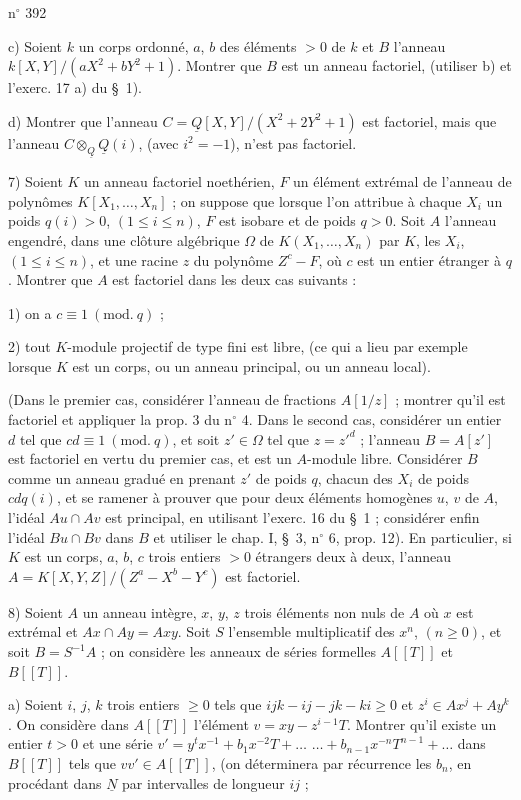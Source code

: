 \hfill n$^{\circ}$ 392

c) Soient $k$ un corps ordonné, $a$, $b$ des éléments $>0$ de $k$ et $B$ l'anneau $k[X,Y]/(aX^2+bY^2+1)$. Montrer que $B$ est un anneau factoriel, (utiliser b) et l'exerc. 17 a) du \S~1).

d) Montrer que l'anneau $C=\underline{Q}[X,Y]/(X^2+2Y^2+1)$ est factoriel, mais que l'anneau $C\otimes_{\underline{Q}}\underline{Q}(i)$, (avec $i^2=-1$), n'est pas factoriel.

7) Soient $K$ un anneau factoriel noethérien, $F$ un élément extrémal de l'anneau de polynômes $K[X_1,\ldots,X_n]$ ; on suppose que lorsque l'on attribue à chaque $X_i$ un poids $q(i)>0$, $(1\leq i\leq n)$, $F$ est isobare et de poids $q>0$. Soit $A$ l'anneau engendré, dans une clôture algébrique $\Omega$ de $K(X_1,\ldots,X_n)$ par $K$, les $X_i$, $(1\leq i\leq n)$, et une racine $z$ du polynôme $Z^c-F$, où $c$ est un entier étranger à $q$. Montrer que $A$ est factoriel dans les deux cas suivants :

1) on a $c\equiv 1\ (\mathrm{mod.}\ q)$ ;

2) tout $K$-module projectif de type fini est libre, (ce qui a lieu par exemple lorsque $K$ est un corps, ou un anneau principal, ou un anneau local).

(Dans le premier cas, considérer l'anneau de fractions $A[1/z]$ ; montrer qu'il est factoriel et appliquer la prop. 3 du n$^{\circ}$ 4. Dans le second cas, considérer un entier $d$ tel que $cd\equiv 1\ (\mathrm{mod.}\ q)$, et soit $z'\in\Omega$ tel que $z=z'^{d}$ ; l'anneau $B=A[z']$ est factoriel en vertu du premier cas, et est un $A$-module libre. Considérer $B$ comme un anneau gradué en prenant $z'$ de poids $q$, chacun des $X_i$ de poids $cdq(i)$, et se ramener à prouver que pour deux éléments homogènes $u$, $v$ de $A$, l'idéal $Au\cap Av$ est principal, en utilisant l'exerc. 16 du \S~1 ; considérer enfin l'idéal $Bu\cap Bv$ dans $B$ et utiliser le chap. I, \S~3, n$^{\circ}$ 6, prop. 12). En particulier, si $K$ est un corps, $a$, $b$, $c$ trois entiers $>0$ étrangers deux à deux, l'anneau $A=K[X,Y,Z]/(Z^a-X^b-Y^c)$ est factoriel.

8) Soient $A$ un anneau intègre, $x$, $y$, $z$ trois éléments non nuls de $A$ où $x$ est extrémal et $Ax\cap Ay=Axy$. Soit $S$ l'ensemble multiplicatif des $x^n$, $(n\geq 0)$, et soit $B=S^{-1}A$ ; on considère les anneaux de séries formelles $A[[T]]$ et $B[[T]]$.

a) Soient $i$, $j$, $k$ trois entiers $\geq 0$ tels que $ijk-ij-jk-ki\geq 0$ et $z^i\in Ax^j+Ay^k$. On considère dans $A[[T]]$ l'élément $v=xy-z^{i-1}T$. Montrer qu'il existe un entier $t>0$ et une série $v'=y^t x^{-1}+b_1x^{-2}T+\ldots$ $\ldots+b_{n-1}x^{-n}T^{n-1}+\ldots$ dans $B[[T]]$ tels que $vv'\in A[[T]]$, (on déterminera par récurrence les $b_n$, en procédant dans $\underline{N}$ par intervalles de longueur $ij$ ;
